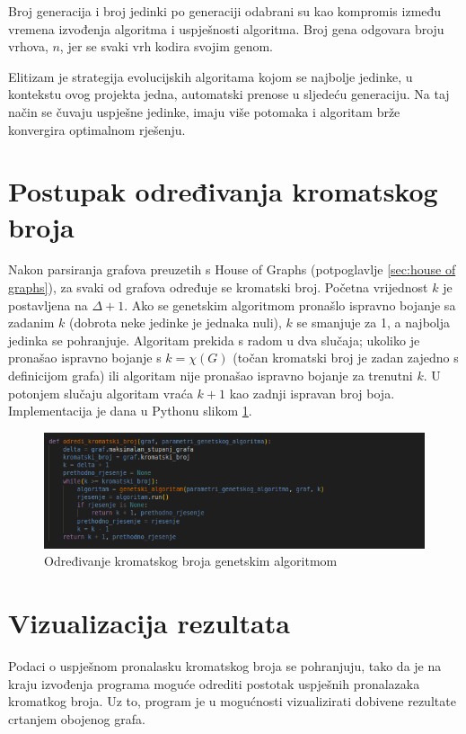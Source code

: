 \documentclass[times, utf8, zavrsni]{fer}
\begin{document}
Broj generacija i broj jedinki po generaciji odabrani su kao kompromis između vremena izvođenja algoritma i uspješnosti algoritma. Broj gena odgovara broju vrhova, $n$, jer se svaki vrh kodira svojim genom. 

Elitizam je strategija evolucijskih algoritama kojom se najbolje jedinke, u kontekstu ovog projekta jedna, automatski prenose u sljedeću generaciju. Na taj način se čuvaju uspješne jedinke, imaju više potomaka i algoritam brže konvergira optimalnom rješenju. 

\section{Postupak određivanja kromatskog broja}
Nakon parsiranja grafova preuzetih s House of Graphs (potpoglavlje \ref{sec:house of graphs}), za svaki od grafova određuje se kromatski broj. Početna vrijednost $k$ je postavljena na $\Delta + 1$. Ako se genetskim algoritmom pronašlo ispravno bojanje sa zadanim $k$ (dobrota neke jedinke je jednaka nuli), $k$ se smanjuje za 1, a najbolja jedinka se pohranjuje. Algoritam prekida s radom u dva slučaja; ukoliko je pronašao ispravno bojanje s $k=\chi(G)$ (točan kromatski broj je zadan zajedno s definicijom grafa) ili algoritam nije pronašao ispravno bojanje za trenutni $k$. U potonjem slučaju algoritam vraća $k+1$ kao zadnji ispravan broj boja. Implementacija je dana u Pythonu slikom \ref{fig:odredivanje kromatskog broja genetskim algoritmom}.

\begin{figure}[htb]
\centering
\includegraphics[width=14cm]{images/genetski_algoritam_i_odredivanje_broja.png}
\caption{Određivanje kromatskog broja genetskim algoritmom}
\label{fig:odredivanje kromatskog broja genetskim algoritmom}
\end{figure}

\section{Vizualizacija rezultata}
Podaci o uspješnom pronalasku kromatskog broja se pohranjuju, tako da je na kraju izvođenja programa moguće odrediti postotak uspješnih pronalazaka kromatkog broja. Uz to, program je u mogućnosti vizualizirati dobivene rezultate crtanjem obojenog grafa.
\end{document}
